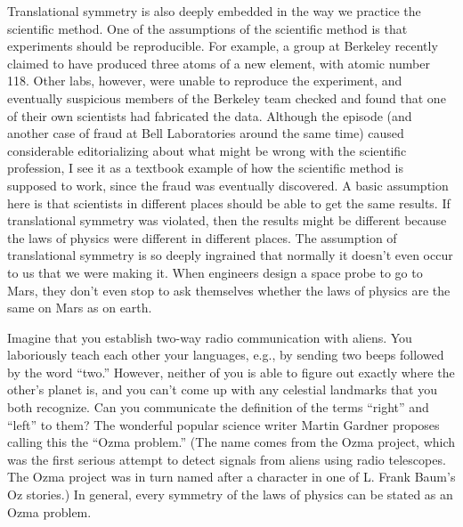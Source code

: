 
Translational symmetry is also deeply embedded in the way we practice the scientific
method. One of the assumptions of the scientific method is that experiments should
be reproducible. For example, a group at Berkeley recently claimed to have produced
three atoms of a new element, with atomic number 118. Other labs, however, were
unable to reproduce the experiment, and eventually suspicious members of the Berkeley
team checked and found that one of their own scientists had fabricated the data.
Although the episode (and another case of fraud at Bell Laboratories around the same
time) caused considerable editorializing about what might be wrong with the
scientific profession, I see it as a textbook example of how the scientific method
is supposed to work, since the fraud was eventually discovered. A basic assumption
here is that scientists in different places should be able to get the same
results. If translational symmetry was violated, then the results might be different
because the laws of physics were different in different places. The assumption of
translational symmetry is so deeply ingrained that normally it doesn't
even occur to us that we were making it. When engineers design a space probe to
go to Mars, they don't even stop to ask themselves whether the laws of physics
are the same on Mars as on earth.

\dqheader

\begin{dq}\label{dq:ozma}
Imagine that you establish two-way radio communication with aliens. You laboriously
teach each other your languages, e.g., by sending two beeps followed by the word
``two.'' However, neither of
you is able to figure out exactly where the other's planet is, and you can't
come up with any celestial landmarks that you both recognize. Can you communicate
the definition of the terms ``right'' and ``left'' to them? The wonderful popular science
writer Martin Gardner proposes calling this the ``Ozma problem.'' (The name comes
from the Ozma project, which was the first serious attempt to detect signals from
aliens using radio telescopes. The Ozma project was in turn named after a character
in one of L. Frank Baum's Oz stories.) In general, every
symmetry of the laws of physics can be stated as an Ozma problem.
\end{dq}


